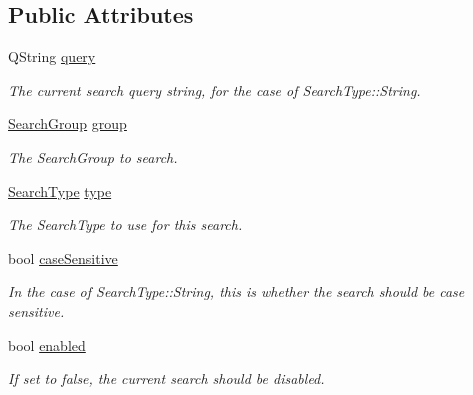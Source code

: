 \subsection*{Public Attributes}
\begin{DoxyCompactItemize}
\item 
\hypertarget{struct_search_request_aca633ba315d9c6c2c635c2b1e8845390}{Q\-String \hyperlink{struct_search_request_aca633ba315d9c6c2c635c2b1e8845390}{query}}\label{struct_search_request_aca633ba315d9c6c2c635c2b1e8845390}

\begin{DoxyCompactList}\small\item\em The current search query string, for the case of Search\-Type\-::\-String. \end{DoxyCompactList}\item 
\hypertarget{struct_search_request_af1011ddf957c3617a37d47d08c171a9a}{\hyperlink{struct_search_request_a9cbf0fa4db86fccb45d34cc7d254dd53}{Search\-Group} \hyperlink{struct_search_request_af1011ddf957c3617a37d47d08c171a9a}{group}}\label{struct_search_request_af1011ddf957c3617a37d47d08c171a9a}

\begin{DoxyCompactList}\small\item\em The Search\-Group to search. \end{DoxyCompactList}\item 
\hypertarget{struct_search_request_a40c275baf144a747bc660a22ba9713cf}{\hyperlink{struct_search_request_a715ada4359cbb4eacc24e02015445dc7}{Search\-Type} \hyperlink{struct_search_request_a40c275baf144a747bc660a22ba9713cf}{type}}\label{struct_search_request_a40c275baf144a747bc660a22ba9713cf}

\begin{DoxyCompactList}\small\item\em The Search\-Type to use for this search. \end{DoxyCompactList}\item 
\hypertarget{struct_search_request_a62864a7f29e2878ed9c87dc063dbb982}{bool \hyperlink{struct_search_request_a62864a7f29e2878ed9c87dc063dbb982}{case\-Sensitive}}\label{struct_search_request_a62864a7f29e2878ed9c87dc063dbb982}

\begin{DoxyCompactList}\small\item\em In the case of Search\-Type\-::\-String, this is whether the search should be case sensitive. \end{DoxyCompactList}\item 
\hypertarget{struct_search_request_a7cc91f29c41992c02bb1b46a9d4a0cc0}{bool \hyperlink{struct_search_request_a7cc91f29c41992c02bb1b46a9d4a0cc0}{enabled}}\label{struct_search_request_a7cc91f29c41992c02bb1b46a9d4a0cc0}

\begin{DoxyCompactList}\small\item\em If set to false, the current search should be disabled. \end{DoxyCompactList}\end{DoxyCompactItemize}


